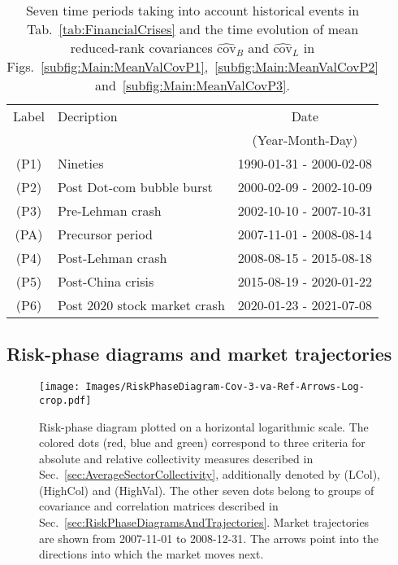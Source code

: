 \documentclass[aps, pra, groupedaddress, showkeys, twocolumn, floatfix, 10pt]{revtex4-2}
\newcommand*\meanNONDiag[1]{\widehat{#1}}
\begin{document}
\begin{table}[!htb]
	\centering
	\caption{\label{tab:TimePeriods}
		Seven time periods taking into account historical events in Tab.~\ref{tab:FinancialCrises} and the time evolution of mean reduced-rank covariances $\meanNONDiag{\text{cov}}_{{B}}$ and $\meanNONDiag{\text{cov}}_{{L}}$ in Figs.~\ref{subfig:Main:MeanValCovP1},~\ref{subfig:Main:MeanValCovP2} and~\ref{subfig:Main:MeanValCovP3}.
	}
	\begin{tabular}{cl@{\hspace{1em}}c}
		\toprule
		Label &
		Decription &
		\multicolumn{1}{c}{Date}
		\\
		&
		&
		\multicolumn{1}{c}{(Year-Month-Day)} \\
		\midrule
		(P1) & Nineties & 1990-01-31 - 2000-02-08 \\
		(P2) & Post Dot-com bubble burst & 2000-02-09 - 2002-10-09 \\
		(P3) & Pre-Lehman crash & 2002-10-10 - 2007-10-31 \\
		(PA) & Precursor period & 2007-11-01 - 2008-08-14 \\
		(P4) & Post-Lehman crash & 2008-08-15 - 2015-08-18 \\
		(P5) & Post-China crisis & 2015-08-19 - 2020-01-22 \\
		(P6) & Post 2020 stock market crash  & 2020-01-23 - 2021-07-08 \\
		\bottomrule
	\end{tabular}
\end{table}



\subsection{\label{sec:RiskPhaseDiagramsAndTrajectories}Risk-phase diagrams and market trajectories}








%
\begin{figure}[!htb]
	\centering
	\texttt{[image: Images/RiskPhaseDiagram-Cov-3-va-Ref-Arrows-Log-crop.pdf]}
	\caption{\label{fig:RiskPhaseCovLog} Risk-phase diagram plotted on a horizontal logarithmic scale.
		The colored dots (red, blue and green) correspond to three criteria for absolute and relative collectivity measures described in Sec.~\ref{sec:AverageSectorCollectivity}, additionally denoted by (LCol), (HighCol) and (HighVal). 
		The other seven dots belong to groups of covariance and correlation matrices described in Sec.~\ref{sec:RiskPhaseDiagramsAndTrajectories}. Market trajectories are shown from \mbox{2007-11-01} to \mbox{2008-12-31}. The arrows point into the directions into which the market moves next.}
	\label{fig:RiskPhaseLog}
\end{figure}
%
\end{document}
